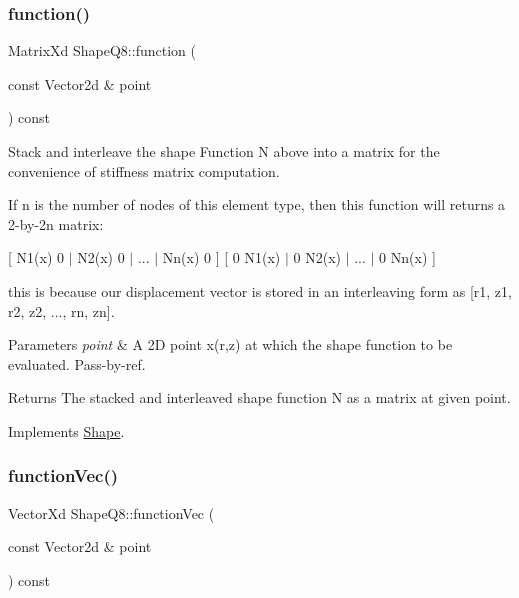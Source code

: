 \subsubsection{\texorpdfstring{function()}{function()}}
{\footnotesize\ttfamily Matrix\+Xd Shape\+Q8\+::function (\begin{DoxyParamCaption}\item[{const Vector2d \&}]{point }\end{DoxyParamCaption}) const\hspace{0.3cm}{\ttfamily [virtual]}}



Stack and interleave the shape Function N above into a matrix for the convenience of stiffness matrix computation. 

If n is the number of nodes of this element type, then this function will returns a 2-\/by-\/2n matrix\+:

\mbox{[} N1(x) 0 $\vert$ N2(x) 0 $\vert$ ... $\vert$ Nn(x) 0 \mbox{]} \mbox{[} 0 N1(x) $\vert$ 0 N2(x) $\vert$ ... $\vert$ 0 Nn(x) \mbox{]}

this is because our displacement vector is stored in an interleaving form as \mbox{[}r1, z1, r2, z2, ..., rn, zn\mbox{]}.


\begin{DoxyParams}{Parameters}
{\em point} & A 2D point x(r,z) at which the shape function to be evaluated. Pass-\/by-\/ref. \\
\hline
\end{DoxyParams}
\begin{DoxyReturn}{Returns}
The stacked and interleaved shape function N as a matrix at given point. 
\end{DoxyReturn}


Implements \mbox{\hyperlink{class_shape_ab6e0d64b40e09c176ce2ece24bc94a37}{Shape}}.

\mbox{\label{class_shape_q8_a7e2de42658deff3c6912cc102b12cc96}} 
\subsubsection{\texorpdfstring{function\+Vec()}{functionVec()}}
{\footnotesize\ttfamily Vector\+Xd Shape\+Q8\+::function\+Vec (\begin{DoxyParamCaption}\item[{const Vector2d \&}]{point }\end{DoxyParamCaption}) const\hspace{0.3cm}{\ttfamily [virtual]}}



